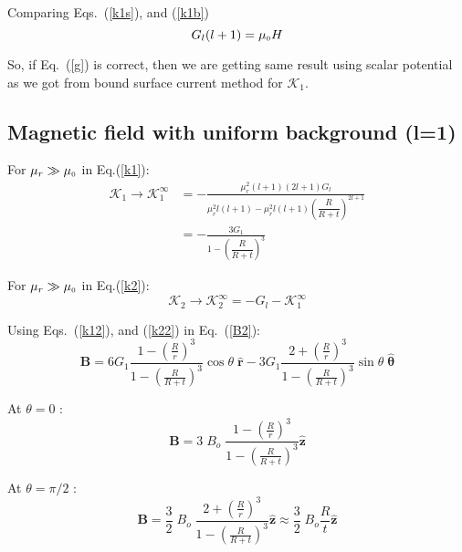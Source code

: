 Comparing Eqs.~(\ref{k1s}), and (\ref{k1b})
\begin{equation}\label{g}
G_l(l+1)=\mu_{\scriptscriptstyle 0} H
\end{equation}

So, if Eq.~(\ref{g}) is correct, then we are getting same result using scalar potential as we got from bound surface current method for $\mathcal{K}_1$.

\subsection{Magnetic field with uniform background (l=1)}

For \(\mu_r\gg\mu_{\scriptscriptstyle 0}\) in Eq.(\ref{k1}):
\begin{equation}\label{k12}
\begin{split}
\mathcal{K}_1\rightarrow\mathcal{K}_1^\infty & =-\frac{\mu_r^2(l+1) (2l+1)G_l}{\mu_r^2 l(l+1)-\mu_r^2 l(l+1)\left(\dfrac{R}{R+t}\right)^{2l+1}}\\
& =-\frac{3 G_1}{1-\left(\dfrac{R}{R+t}\right)^{3}}
\end{split}
\end{equation}

For \(\mu_r\gg\mu_{\scriptscriptstyle 0}\) in Eq.(\ref{k2}):
\begin{equation}\label{k22}
\mathcal{K}_2\rightarrow\mathcal{K}_2^\infty=-G_l-\mathcal{K}_1^\infty
\end{equation}

Using Eqs.~(\ref{k12}), and (\ref{k22}) in Eq.~(\ref{B2}):
\begin{equation}
    \bm{B}=6 G_1\frac{1-\left(\frac{R}{r}\right)^3}{1-\left(\frac{R}{R+t}\right)^3}\cos\theta\;\bm{\hat{r}}-3 G_1\frac{2+\left(\frac{R}{r}\right)^3}{1-\left(\frac{R}{R+t}\right)^3}\sin\theta\;\bm{\hat{\theta}}
\end{equation}

At $\theta=0$ :
\begin{equation}
    \bm{B}=3\;B_o\;\frac{1-\left(\frac{R}{r}\right)^3}{1-\left(\frac{R}{R+t}\right)^3}\bm{\hat{z}}
\end{equation}

At $\theta=\pi/2$ :
\begin{equation}
    \bm{B}=\frac{3}{2}\;B_o\;\frac{2+\left(\frac{R}{r}\right)^3}{1-\left(\frac{R}{R+t}\right)^3}\bm{\hat{z}}\approx \frac{3}{2}\;B_o\frac{R}{t}\bm{\hat{z}}
\end{equation}

